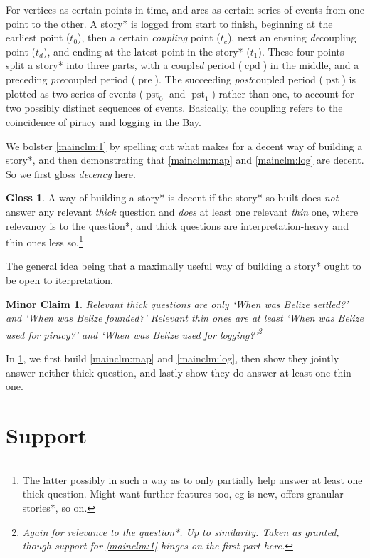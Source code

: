 \documentclass{amsart}
\newcommand{\mention}[1]{\textit{#1}}%
\DeclareMathOperator{\pre}{pre}%
\DeclareMathOperator{\pst}{pst}%
\DeclareMathOperator{\cpd}{cpd}%
\newtheorem{minrclm}{Minor Claim}%
\theoremstyle{definition}
\newtheorem{gloss}{Gloss}%
\theoremstyle{remark}
\begin{document}
	For vertices as certain points in time, and arcs as certain series of events from one point to the other. A story* is logged from start to finish, beginning at the earliest point (\(t_0\)), then a certain \mention{coupling} point (\(t_c\)), next an ensuing \mention{de}coupling point (\(t_d\)), and ending at the latest point in the story* (\(t_1\)). These four points split a story* into three parts, with a coupl\mention{ed} period (\(\cpd\)) in the middle, and a preceding \mention{pre}coupled period (\(\pre\)). The succeeding \mention{post}coupled period (\(\pst\)) is plotted as two series of events (\(\pst_0\) and \(\pst_1\)) rather than one, to account for two possibly distinct sequences of events. Basically, the coupling refers to the coincidence of piracy and logging in the Bay.
	
	We bolster \ref{mainclm:1} by spelling out what makes for a decent way of building a story*, and then demonstrating that \ref{mainclm:map} and \ref{mainclm:log} are decent. So we first gloss \mention{decency} here.
	\begin{gloss}
	\label{gloss:decency}
		A way of building a story* is decent if the story* so built does \emph{not} answer any relevant \mention{thick} question and \emph{does} at least one relevant \mention{thin} one, where relevancy is to the question*, and thick questions are interpretation-heavy and thin ones less so.\footnote{The latter possibly in such a way as to only partially help answer at least one thick question. Might want further features too, eg is new, offers granular stories*, so on.}
	\end{gloss}
	The general idea being that a maximally useful way of building a story* ought to be open to iterpretation.
	\begin{minrclm}
	\label{minrclm:questions}
	Relevant thick questions are only `When was Belize settled?' and `When was Belize founded?' Relevant thin ones are at least `When was Belize used for piracy?' and `When was Belize used for logging?'\footnote{Again for relevance to the question*. Up to similarity. Taken as granted, though support for \ref{mainclm:1} hinges on the first part here.}
	\end{minrclm}
	In \ref{s:support}, we first build \ref{mainclm:map} and \ref{mainclm:log}, then show they jointly answer neither thick question, and lastly show they do answer at least one thin one.
%
%
%
\section{Support}
	\label{s:support}
\end{document}
